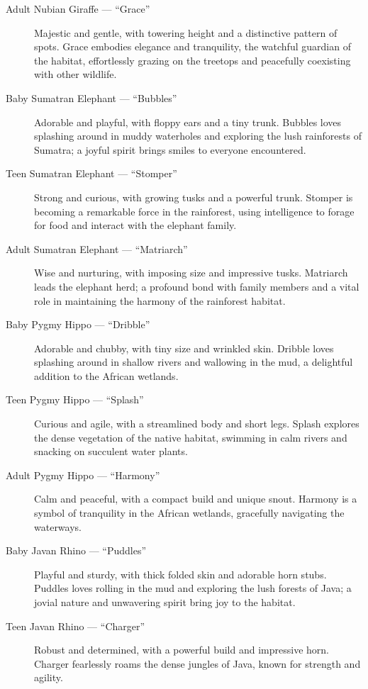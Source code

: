 \begin{description}
  \item[Adult Nubian Giraffe --- ``Grace''] Majestic and gentle, with towering height and a distinctive pattern of spots. Grace embodies elegance and tranquility, the watchful guardian of the habitat, effortlessly grazing on the treetops and peacefully coexisting with other wildlife.

  \item[Baby Sumatran Elephant --- ``Bubbles''] Adorable and playful, with floppy ears and a tiny trunk. Bubbles loves splashing around in muddy waterholes and exploring the lush rainforests of Sumatra; a joyful spirit brings smiles to everyone encountered.

  \item[Teen Sumatran Elephant --- ``Stomper''] Strong and curious, with growing tusks and a powerful trunk. Stomper is becoming a remarkable force in the rainforest, using intelligence to forage for food and interact with the elephant family.

  \item[Adult Sumatran Elephant --- ``Matriarch''] Wise and nurturing, with imposing size and impressive tusks. Matriarch leads the elephant herd; a profound bond with family members and a vital role in maintaining the harmony of the rainforest habitat.

  \item[Baby Pygmy Hippo --- ``Dribble''] Adorable and chubby, with tiny size and wrinkled skin. Dribble loves splashing around in shallow rivers and wallowing in the mud, a delightful addition to the African wetlands.

  \item[Teen Pygmy Hippo --- ``Splash''] Curious and agile, with a streamlined body and short legs. Splash explores the dense vegetation of the native habitat, swimming in calm rivers and snacking on succulent water plants.

  \item[Adult Pygmy Hippo --- ``Harmony''] Calm and peaceful, with a compact build and unique snout. Harmony is a symbol of tranquility in the African wetlands, gracefully navigating the waterways.

  \item[Baby Javan Rhino --- ``Puddles''] Playful and sturdy, with thick folded skin and adorable horn stubs. Puddles loves rolling in the mud and exploring the lush forests of Java; a jovial nature and unwavering spirit bring joy to the habitat.

  \item[Teen Javan Rhino --- ``Charger''] Robust and determined, with a powerful build and impressive horn. Charger fearlessly roams the dense jungles of Java, known for strength and agility.


\end{description}
